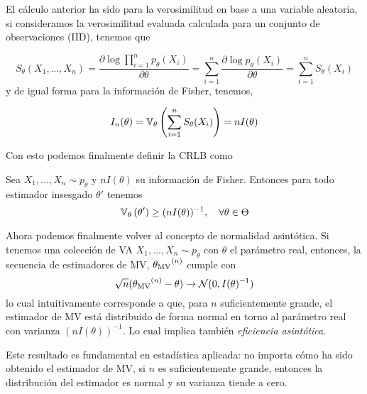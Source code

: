 \begin{exercise}
	
\end{exercise}

El cálculo anterior ha sido para la verosimilitud en base a una variable aleatoria, si consideramos la verosimilitud evaluada calculada para un conjunto de observaciones (IID), tenemos que

\begin{equation}
	S_\theta(X_1,\ldots,X_n) = \frac{\partial \log \prod_{i=1}^np_\theta(X_i)}{\partial\theta} = \sum_{i=1}^n\frac{\partial \log p_\theta(X_i)}{\partial\theta}= \sum_{i=1}^n S_\theta(X_i)
\end{equation}
y de igual forma para la información de Fisher, tenemos, 

\begin{equation}
	I_n(\theta) = \mathbb{V}_\theta \left(\sum_{i=1}^n S_\theta(X_i)\right) = n I(\theta)
\end{equation}

Con esto podemos finalmente definir la CRLB como 

\begin{definition}
	Sea $X_1,\ldots,X_n \sim p_\theta$ y $nI(\theta)$ su información de Fisher. Entonces para todo estimador insesgado $\theta'$ tenemos 
	\begin{equation}
		\mathbb{V}_\theta \left(\theta'\right)\geq (nI(\theta))^{-1},\quad \forall \theta\in\Theta
	\end{equation}
\end{definition}

Ahora podemos finalmente volver al concepto de normalidad asintótica. Si tenemos una colección de VA $X_1,\ldots,X_n\sim p_\theta$ con $\theta$ el parámetro real, entonces, la secuencia de estimadores de MV, ${\theta_\text{MV}}^{(n)}$ cumple con 
\begin{equation}
	\sqrt{n}({\theta_\text{MV}}^{(n)}-\theta)\rightarrow {\mathcal N}(0,I(\theta)^{-1})
\end{equation}
lo cual intuitivamente corresponde a que, para $n$ suficientemente grande, el estimador de MV está distribuido de forma normal en torno al parámetro real con varianza $(nI(\theta))^{-1}$. Lo cual implica también \textit{eficiencia asintótica}.

Este resultado es fundamental en estadística aplicada: no importa cómo ha sido obtenido el estimador de MV, si $n$ es suficientemente grande, entonces la distribución del estimador es normal y su varianza tiende a cero. 



